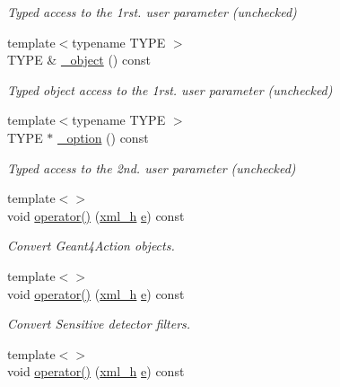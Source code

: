\begin{DoxyCompactItemize}
\begin{DoxyCompactList}\small\item\em Typed access to the 1rst. user parameter (unchecked) \end{DoxyCompactList}\item 
{\footnotesize template$<$typename T\+Y\+PE $>$ }\\T\+Y\+PE \& \hyperlink{struct_d_d4hep_1_1_converter_a48f7c116ed37009a1c202123ee4bf59a}{\+\_\+object} () const
\begin{DoxyCompactList}\small\item\em Typed object access to the 1rst. user parameter (unchecked) \end{DoxyCompactList}\item 
{\footnotesize template$<$typename T\+Y\+PE $>$ }\\T\+Y\+PE $\ast$ \hyperlink{struct_d_d4hep_1_1_converter_a913c3e6a261d4b78972a1f73f28cfcd5}{\+\_\+option} () const
\begin{DoxyCompactList}\small\item\em Typed access to the 2nd. user parameter (unchecked) \end{DoxyCompactList}\item 
{\footnotesize template$<$$>$ }\\void \hyperlink{struct_d_d4hep_1_1_converter_aac950482c88047edebc7e7fb56d3b04e}{operator()} (\hyperlink{_det_factory_helper_8h_ac13b3c79d2bc9214ff0cf5b8dc43dda6}{xml\+\_\+h} \hyperlink{_volumes_8cpp_a8a9a1f93e9b09afccaec215310e64142}{e}) const
\begin{DoxyCompactList}\small\item\em Convert Geant4\+Action objects. \end{DoxyCompactList}\item 
{\footnotesize template$<$$>$ }\\void \hyperlink{struct_d_d4hep_1_1_converter_ab8a56e6d9fcd3e1ba553e878607dfe75}{operator()} (\hyperlink{_det_factory_helper_8h_ac13b3c79d2bc9214ff0cf5b8dc43dda6}{xml\+\_\+h} \hyperlink{_volumes_8cpp_a8a9a1f93e9b09afccaec215310e64142}{e}) const
\begin{DoxyCompactList}\small\item\em Convert Sensitive detector filters. \end{DoxyCompactList}\item 
{\footnotesize template$<$$>$ }\\void \hyperlink{struct_d_d4hep_1_1_converter_a018529354431939b9321faeae3ffeabc}{operator()} (\hyperlink{_det_factory_helper_8h_ac13b3c79d2bc9214ff0cf5b8dc43dda6}{xml\+\_\+h} \hyperlink{_volumes_8cpp_a8a9a1f93e9b09afccaec215310e64142}{e}) const

\end{DoxyCompactItemize}

